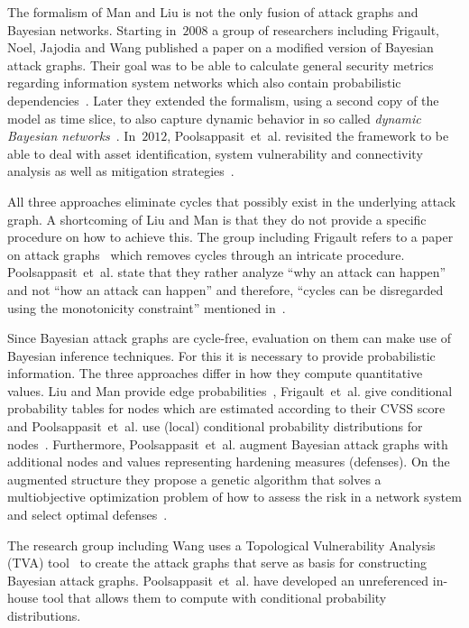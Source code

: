 \documentclass[a4paper]{article}
\begin{document}
The formalism of Man and Liu is not the only fusion of attack graphs and
Bayesian networks. Starting in~$2008$ a group of researchers including Frigault,
Noel, Jajodia and Wang published a paper on a modified version of Bayesian
attack graphs. Their goal was to be able to calculate general security metrics
regarding information system networks which also contain probabilistic
dependencies~\cite{NoJaWaSi,FrWa}. Later they extended the formalism, using a
second copy of the model as time slice, to also capture dynamic behavior in so
called \emph{dynamic Bayesian networks}~\cite{FrWaSiJa}. In~$2012$,
Poolsappasit~et~al. revisited the framework to be able to deal with asset
identification, system vulnerability and connectivity analysis as well as
mitigation strategies~\cite{PoDeRa}.

All three approaches eliminate cycles that possibly exist in the underlying
attack graph. A shortcoming of Liu and Man is that they do not provide a
specific procedure on how to achieve this. The group including Frigault refers
to a paper on attack graphs~\cite{WaIsLoSiJa} which removes cycles through an
intricate procedure.  Poolsappasit~et~al. state that they rather analyze ``why
an attack can happen'' and not ``how an attack can happen'' and therefore,
``cycles can be disregarded using the monotonicity constraint'' mentioned
in~\cite{AmWiKa}.

Since Bayesian attack graphs are cycle-free, evaluation on them can make use
of Bayesian inference techniques. For this it is necessary to provide
probabilistic information. The three approaches differ in how they compute
quantitative values. Liu and Man provide edge probabilities~\cite{LiMa},
Frigault~et~al. give conditional probability tables for nodes which are
estimated according to their CVSS score~\cite{FrWa} and Poolsappasit~et~al.
use (local) conditional probability distributions for nodes~\cite{PoDeRa}.
Furthermore, Poolsappasit~et~al. augment Bayesian attack graphs with
additional nodes and values representing hardening measures (defenses). On the
augmented structure they propose a genetic algorithm that solves a
multiobjective optimization problem of how to assess the risk in a network
system and select optimal defenses~\cite{PoDeRa}.

The research group including Wang uses a Topological Vulnerability Analysis
(TVA) tool~\cite{JaNoOb,NoElJaKaOhPr} to create the attack graphs that serve
as basis for constructing Bayesian attack graphs. Poolsappasit~et~al. have
developed an unreferenced in-house tool that allows them to compute with
conditional probability distributions.
\end{document}
